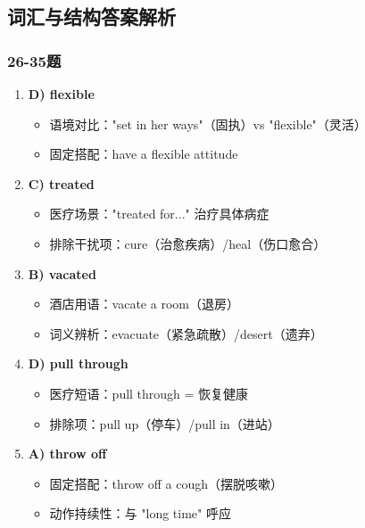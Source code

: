\documentclass{article}
\begin{document}
\subsection*{词汇与结构答案解析}

\subsubsection*{26-35题}
\begin{enumerate}[label=\textbf{\arabic*.}]
    \item \textbf{D) flexible} 
    \begin{itemize}
        \item 语境对比："set in her ways"（固执）vs "flexible"（灵活）
        \item 固定搭配：have a flexible attitude
    \end{itemize}
    
    \item \textbf{C) treated} 
    \begin{itemize}
        \item 医疗场景："treated for..." 治疗具体病症
        \item 排除干扰项：cure（治愈疾病）/heal（伤口愈合）
    \end{itemize}
    
    \item \textbf{B) vacated} 
    \begin{itemize}
        \item 酒店用语：vacate a room（退房）
        \item 词义辨析：evacuate（紧急疏散）/desert（遗弃）
    \end{itemize}
    
    \item \textbf{D) pull through} 
    \begin{itemize}
        \item 医疗短语：pull through = 恢复健康
        \item 排除项：pull up（停车）/pull in（进站）
    \end{itemize}
    
    \item \textbf{A) throw off} 
    \begin{itemize}
        \item 固定搭配：throw off a cough（摆脱咳嗽）
        \item 动作持续性：与 "long time" 呼应
    \end{itemize}
    

\end{enumerate}
\end{document}
